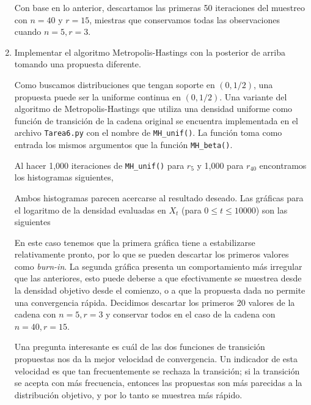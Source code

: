 \documentclass{article}
\begin{document}
\begin{enumerate}
    Con base en lo anterior, descartamos las primeras 50 iteraciones del muestreo con $n=40$ y $r=15$,
    miestras que conservamos todas las observaciones cuando $n=5, r=3$.
    
    

    \item  Implementar el algoritmo Metropolis-Hastings con la posterior de arriba
    tomando una propuesta diferente.

    Como buscamos distribuciones que tengan soporte en $(0,1/2)$, una propuesta puede ser la uniforme
    continua en $(0,1/2)$. Una variante del algoritmo de Metropolis-Hastings que utiliza una densidad
    uniforme como función de transición de la cadena original se encuentra implementada en el archivo
    \texttt{Tarea6.py} con el nombre de \texttt{MH\_unif()}. La función toma como entrada los mismos 
    argumentos que la función \texttt{MH\_beta()}.

    Al hacer 1,000 iteraciones de \texttt{MH\_unif()} para $r_5$ y 1,000 para $r_{40}$ encontramos
    los histogramas siguientes,

    \begin{center}
        
        
    \end{center}

    Ambos histogramas parecen acercarse al resultado deseado. Las gráficas para el logaritmo 
    de la densidad evaluadas en $X_t$ (para $0 \le t \le 10000$) son las siguientes

    \begin{center}
        
        
    \end{center}

    En este caso tenemos que la primera gráfica tiene a estabilizarse relativamente pronto, por lo
    que se pueden descartar los primeros valores como \textit{burn-in}. La segunda gráfica presenta
    un comportamiento más irregular que las anteriores, esto puede deberse a que efectivamente se muestrea desde la
    densidad objetivo desde el comienzo, o a que la propuesta dada no permite una convergencia rápida.
    Decidimos descartar los primeros 20 valores de la cadena con $n=5, r = 3$ y conservar todos en el
    caso de la cadena con $n=40, r = 15$.

    Una pregunta interesante es cuál de las dos funciones de transición propuestas nos da la mejor
    velocidad de convergencia. Un indicador de esta velocidad es que tan frecuentemente se rechaza la
    transición; si la transición se acepta con más frecuencia, entonces las propuestas son más parecidas
    a la distribución objetivo, y por lo tanto se muestrea más rápido.


\end{enumerate}
\end{document}
